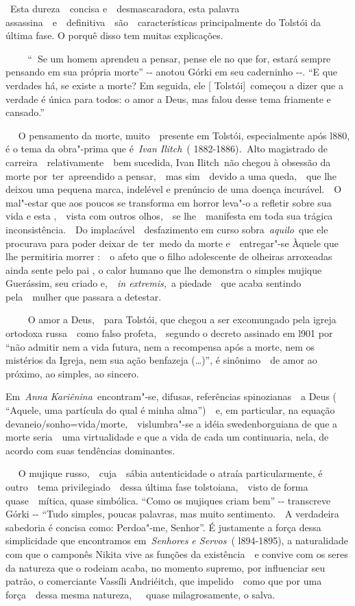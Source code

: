 ~Esta dureza~~concisa e~~desmascaradora, esta palavra
assassina~~e~~definitiva~~são~~características principalmente do Tolstói
da última fase. O porquê disso tem muitas explicações.~

\textbf{~~~~}``\textbf{~}Se um homem aprendeu a pensar, pense ele no que
for, estará sempre pensando em sua própria morte'' -\/- anotou Górki em
seu caderninho -\/-. ``E que verdades há, se existe a morte? Em seguida,
ele {[} Tolstói{]}~começou a dizer que a verdade é única para todos: o
amor a Deus, mas falou desse tema friamente e cansado.''

~~ O pensamento da morte, muito~~presente em Tolstói, especialmente após
l880, é o tema da obra"-prima que é~\emph{Ivan Ilitch}~(
1882-1886)\emph{.~}Alto magistrado de carreira~~relativamente~~bem
sucedida, Ivan Ilitch\emph{~}não chegou à obsessão da morte
por~ter~apreendido a pensar,~~mas sim~~devido a uma queda,~~que lhe
deixou uma pequena marca, indelével e prenúncio de uma doença
incurável.~~O mal"-estar que aos poucos se transforma em horror leva"-o a
refletir sobre sua vida e esta ,~~vista com outros olhos,~~se
lhe~~manifesta em toda sua trágica inconsistência.~~Do
implacável~~desfazimento em curso sobra~\emph{aquilo}~que ele procurava
para poder deixar de~ter~medo da morte e~~entregar"-se Àquele que lhe
permitiria morrer :~~o afeto que o filho adolescente de olheiras
arroxeadas ainda sente pelo pai , o calor humano que lhe demonstra o
simples mujique Guerássim, seu criado e,~~\emph{in extremis,}~a
piedade~~que acaba sentindo pela~~mulher que passara a detestar.

~~~~ O amor a Deus,~~para Tolstói, que chegou a ser excomungado pela
igreja ortodoxa russa~~como falso profeta,~~segundo o decreto assinado
em l901 por ``não admitir nem a vida futura, nem a recompensa após a
morte, nem os mistérios da Igreja, nem sua ação benfazeja (\ldots{})'', é
sinônimo~~de amor ao próximo, ao simples, ao sincero.

Em~\emph{Anna Kariênina~}encontram"-se, difusas, referências
spinozianas~~a Deus ( ``Aquele, uma partícula do qual é minha
alma'')\emph{~}~e, em particular, na equação
devaneio/sonho=vida/morte,~~vislumbra"-se a idéia swedenborguiana de que
a morte seria~~uma virtualidade e que a vida de cada um continuaria,
nela, de acordo com suas tendências dominantes.

~ ~O mujique russo,~~cuja~~sábia autenticidade o atraía particularmente,
é outro~~tema privilegiado~~dessa última fase tolstoiana,~~visto de
forma quase~~mítica, quase simbólica. ``Como os mujiques criam bem''
-\/- transcreve Górki -\/- ``Tudo simples, poucas palavras, mas muito
sentimento.~~A verdadeira sabedoria é concisa como: Perdoa"-me, Senhor''.
É justamente a força dessa simplicidade que encontramos
em~\emph{Senhores e Servos~}( l894-1895), a naturalidade com que o
camponês Nikita vive as funções da existência~~e convive com os seres da
natureza que o rodeiam acaba, no momento supremo, por influenciar seu
patrão, o comerciante Vassíli Andriéitch, que impelido~~como que por uma
força~~dessa mesma natureza,~~~quase milagrosamente, o salva.

